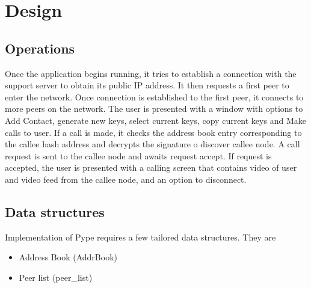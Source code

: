 \documentclass[a4paper,11pt]{article}
\begin{document}
	\section{Design}
        \subsection{Operations}
        Once the application begins running, it tries to establish a connection with the support server to obtain its public IP address. It then requests a first peer to enter the network. Once connection is established to the first peer, it connects to more peers on the network. The user is presented with a window with options to Add Contact, generate new keys, select current keys, copy current keys and Make calls to user. If a call is made, it checks the address book entry corresponding to the callee hash address and decrypts the signature o discover callee node. A call request is sent to the callee node and awaits request accept. If request is accepted, the user is presented with a calling screen that contains video of user and video feed from the callee node, and an option to disconnect.
        \subsection{Data structures}
Implementation of Pype requires a few tailored data structures. They are
\begin{itemize}
\item Address Book (AddrBook)
\item Peer list (peer\_list)
\end{itemize}
\end{document}
